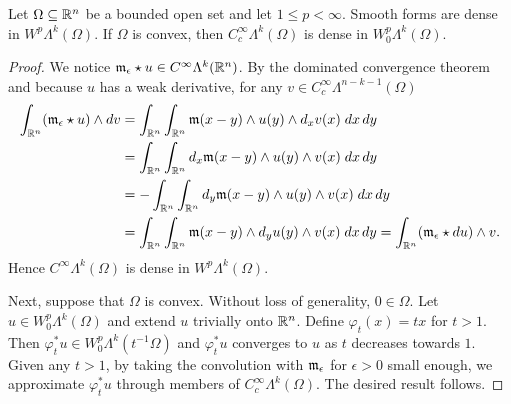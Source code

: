 \documentclass[10pt,a4paper]{article}
\begin{document}
\begin{lemma}
    Let $\Omega \subseteq {\mathbb R}^{n}$ be a bounded open set and let $1 \leq p < \infty$. 
    Smooth forms are dense in $W^{p}\Lambda^{k}(\Omega)$.
    If $\Omega$ is convex, then $C^{\infty}_{c}\Lambda^{k}(\Omega)$ is dense in $W^{p}_{0}\Lambda^{k}(\Omega)$.
\end{lemma}
\begin{proof}
    We notice ${\mathfrak m}_{\epsilon} \star u \in C^{\infty}\Lambda^{k}({\mathbb R}^{n})$. 
    By the dominated convergence theorem and because $u$ has a weak derivative,
    for any $v \in C^{\infty}_{c}\Lambda^{n-k-1}(\Omega)$
    \begin{align*}
        \int_{{\mathbb R}^{n}} ( {\mathfrak m}_{\epsilon} \star u ) \wedge d v 
        &= 
        \int_{{\mathbb R}^{n}} \int_{{\mathbb R}^{n}} {\mathfrak m}(x-y) \wedge u(y) \wedge d_{x} v(x) \;dx\,dy
        \\&= 
        \int_{{\mathbb R}^{n}} \int_{{\mathbb R}^{n}} d_x{\mathfrak m}(x-y) \wedge u(y) \wedge v(x) \;dx\,dy
        \\&= 
        - \int_{{\mathbb R}^{n}} \int_{{\mathbb R}^{n}} d_y{\mathfrak m}(x-y) \wedge u(y) \wedge v(x) \;dx\,dy
        \\&= 
        \int_{{\mathbb R}^{n}} \int_{{\mathbb R}^{n}} {\mathfrak m}(x-y) \wedge d_y u(y) \wedge v(x) \;dx\,dy
        = 
        \int_{{\mathbb R}^{n}} ( {\mathfrak m}_{\epsilon} \star d u ) \wedge v 
        .
    \end{align*}
    Hence $C^{\infty}\Lambda^{k}(\Omega)$ is dense in $W^{p}\Lambda^{k}(\Omega)$.
    
    Next, suppose that $\Omega$ is convex. Without loss of generality, $0 \in \Omega$. 
    Let $u \in W^{p}_{0}\Lambda^{k}(\Omega)$ and extend $u$ trivially onto ${\mathbb R}^{n}$. 
    Define $\varphi_t(x) = tx$ for $t > 1$. 
    Then $\varphi_{t}^{\ast} u \in W^{p}_{0}\Lambda^{k}(t^{-1}\Omega)$ 
    and $\varphi_{t}^{\ast} u$ converges to $u$ as $t$ decreases towards $1$. 
    Given any $t > 1$, by taking the convolution with ${\mathfrak m}_{\epsilon}$ for $\epsilon > 0$ small enough,
    we approximate $\varphi_{t}^{\ast} u$ through members of $C^{\infty}_{c}\Lambda^{k}(\Omega)$.
    The desired result follows. 
\end{proof}
\end{document}
